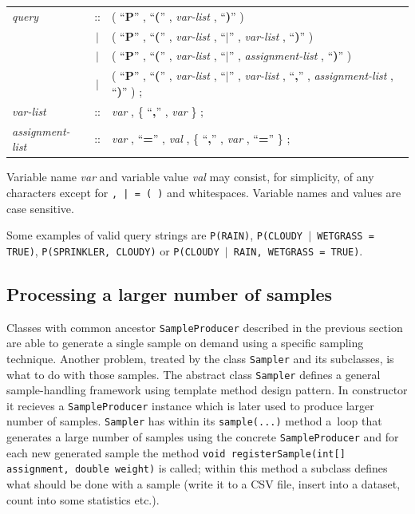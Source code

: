 \documentclass[english,cover]{fitthesis} %
\newcommand{\srccode}[1]{{\tt #1}}         %
\newcommand{\bnfconst}[1]{``\textbf{#1}''} %
\newcommand{\bnfgroup}[1]{\textit{#1}}     %
\begin{document}
\begin{center}
\begin{tabular}{lcl}
    \bnfgroup{query} & ::
        & ( \bnfconst{P} , \bnfconst{(} , \bnfgroup{var-list} , \bnfconst{)} ) \\
    & $\mid$
        & ( \bnfconst{P} , \bnfconst{(} , \bnfgroup{var-list} , \bnfconst{$\mid$} , \bnfgroup{var-list} , \bnfconst{)} ) \\
    & $\mid$
        & ( \bnfconst{P} , \bnfconst{(} , \bnfgroup{var-list} , \bnfconst{$\mid$} , \bnfgroup{assignment-list} , \bnfconst{)} ) \\
    & $\mid$
        & ( \bnfconst{P} , \bnfconst{(} , \bnfgroup{var-list} , \bnfconst{$\mid$} , \bnfgroup{var-list} , \bnfconst{,} , \bnfgroup{assignment-list} , \bnfconst{)} ) ; \\
    \bnfgroup{var-list} & ::
        & \bnfgroup{var} , \{ \bnfconst{,} , \bnfgroup{var} \} ; \\
    \bnfgroup{assignment-list} & ::
        & \bnfgroup{var} , \bnfconst{=} , \bnfgroup{val} , \{ \bnfconst{,} , \bnfgroup{var} , \bnfconst{=} \} ; \\
\end{tabular}
\end{center}

Variable name \bnfgroup{var} and variable value \bnfgroup{val} may consist, for simplicity, of any characters except for {\tt , | = ( )} and whitespaces. Variable names and values are case sensitive.

Some examples of valid query strings are \srccode{P(RAIN)}, \srccode{P(CLOUDY $\mid$ WETGRASS = TRUE)}, \srccode{P(SPRINKLER, CLOUDY)} or \srccode{P(CLOUDY $\mid$ RAIN, WETGRASS = TRUE)}.



\subsection{Processing a larger number of samples}
Classes with common ancestor \srccode{SampleProducer} described in the previous section are able to generate a single sample on demand using a specific sampling technique. Another problem, treated by the class \srccode{Sampler} and its subclasses, is what to do with those samples. The abstract class \srccode{Sampler} defines a general sample-handling framework using template method design pattern. In constructor it recieves a \srccode{SampleProducer} instance which is later used to produce larger number of samples. \srccode{Sampler} has within its \srccode{sample(...)} method a~loop that generates a large number of samples using the concrete \srccode{SampleProducer} and for each new generated sample the method \srccode{void registerSample(int[] assignment, double weight)} is called; within this method a subclass defines what should be done with a sample (write it to a CSV file, insert into a dataset, count into some statistics etc.).
\end{document}
